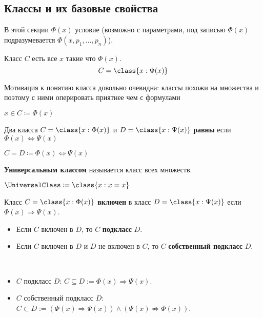 \documentclass{article}
\begin{document}
\subsection{Классы и их базовые свойства}
В этой секции \(\Phi(x)\) условие (возможно с параметрами, \ie под записью \(\Phi(x)\) подразумевается \(\Phi(x, p_1, \ldots, p_n)\)). 
\begin{definition}
    \label{def:class}
    Класс \(C\) есть все \(x\) такие что \(\Phi(x)\).
    \[
        C = \class{x : \Phi(x)}
    \]
\end{definition} 
Мотивация к понятию класса довольно очевидна: классы похожи на множества и поэтому с ними оперировать приятнее чем с формулами
\begin{defnotation}
    \(x \in C \coloneq \Phi(x)\)
\end{defnotation}

\begin{definition}
    \label{def:class-equality}
    Два класса \(C = \class{x : \Phi(x)}\) и \(D = \class{x : \Psi(x)}\) \textbf{равны} если \(\Phi(x) \Leftrightarrow \Psi(x)\)
\end{definition}
\begin{defnotation}
    \(C = D \coloneq \Phi(x) \Leftrightarrow \Psi(x)\)
\end{defnotation}

\begin{definition}
    \label{def:universal-class}
    \textbf{Универсальным классом} называется класс всех множеств.
\end{definition}
\begin{defnotation}
    \(\UniversalClass \coloneq \class{x: x = x}\)
\end{defnotation}

\begin{definition}
    \label{def:subclasses}
    Класс \(C = \class{x : \Phi(x)}\) \textbf{включен} в класс \(D = \class{x : \Psi(x)}\) если \(\Phi(x) \Rightarrow \Psi(x)\). 
    \begin{itemize}
        \item Если \(C\) включен в \(D\), то \(C\) \textbf{подкласс} \(D\).
        \item Если \(C\) включен в \(D\) и \(D\) не включен в \(C\), то  \(C\) \textbf{собственный подкласс} \(D\).
    \end{itemize}
\end{definition}
\begin{defnotation} \  
    \begin{itemize}
        \item \(C\) подкласс \(D\): \(C \subseteq D := \Phi(x) \Rightarrow \Psi(x)\).
        \item \(C\) собственный подкласс \(D\): \(C \subset D := \left(\Phi(x) \Rightarrow \Psi(x)\right) \land \left(\Psi(x) \not\Rightarrow \Phi(x)\right)\).
    \end{itemize}
\end{defnotation}
\end{document}
